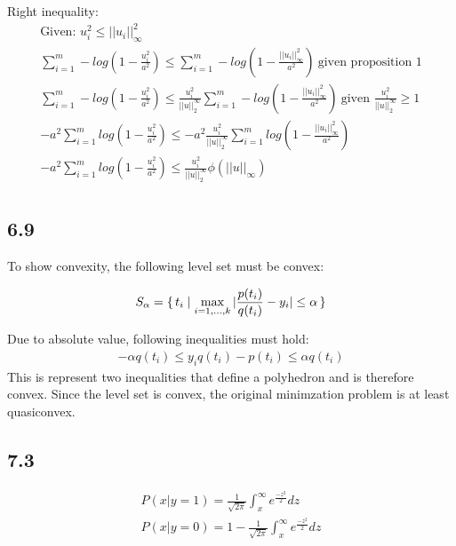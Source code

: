\documentclass[12pt]{article}
\newenvironment{proposition}[2][Proposition]{\begin{trivlist}
\item[\hskip \labelsep {\bfseries #1}\hskip \labelsep {\bfseries #2.}]}{\end{trivlist}}
\begin{document}
Right inequality:
\begin{equation*}
\begin{aligned}
\text{Given: } u_{i}^{2} \le ||u_i||_{\infty}^{2}\\
\sum_{i=1}^{m}-log(1 - \frac{u_{i}^{2}}{a^2}) \le \sum_{i=1}^{m}-log(1 - \frac{||u_{i}||_{\infty}^{2}}{a^2})\ \text{given proposition 1}\\
\sum_{i=1}^{m}-log(1 - \frac{u_{i}^{2}}{a^2}) \le \frac{u_{i}^{2}}{||u||_{2}^{\infty}}\sum_{i=1}^{m}-log(1 - \frac{||u_{i}||_{\infty}^{2}}{a^2})\ \text{given $\frac{u_{i}^{2}}{||u||_{2}^{\infty}} \ge 1$}\\
-a^2\sum_{i=1}^{m}log(1 - \frac{u_{i}^{2}}{a^2}) \le -a^2\frac{u_{i}^{2}}{||u||_{2}^{\infty}}\sum_{i=1}^{m}log(1 - \frac{||u_{i}||_{\infty}^{2}}{a^2})\\
-a^2\sum_{i=1}^{m}log(1 - \frac{u_{i}^{2}}{a^2}) \le \frac{u_{i}^{2}}{||u||_{2}^{\infty}}\phi(||u||_{\infty})\\
\end{aligned}
\end{equation*}

\subsection*{6.9}
To show convexity, the following level set must be convex:

$$S_{\alpha} = \set{t_i| \max_{i=1,\dots,k}|\frac{p(t_i)}{q(t_i)} - y_i| \le \alpha}$$

Due to absolute value, following inequalities must hold:
\begin{equation*}
\begin{aligned}
-\alpha q(t_i) \le y_i q(t_i)-p(t_i) \le \alpha q(t_i)
\end{aligned}
\end{equation*}
 This is represent two inequalities that define a polyhedron and is therefore convex. Since the level set is convex,
 the original minimzation problem is at least quasiconvex.

\subsection*{7.3}

\begin{proposition}{1}
\begin{align}
P(x|y=1) = \frac{1}{\sqrt{2 \pi}}\int_{x}^{\infty}e^{\frac{-z^2}{2}}dz\\
P(x|y=0) = 1 - \frac{1}{\sqrt{2 \pi}}\int_{x}^{\infty}e^{\frac{-z^2}{2}}dz
\end{align}
\end{proposition}
\end{document}
